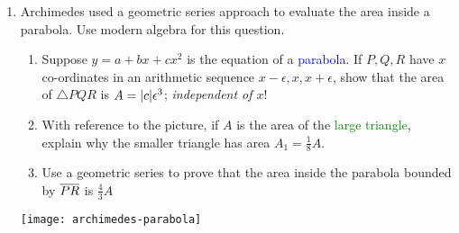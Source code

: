 \begin{exercises}
\begin{enumerate}
	 	\item Archimedes used a geometric series approach to evaluate the area inside a parabola. Use modern algebra for this question.\par
	 	\begin{minipage}[t]{0.6\linewidth}\vspace{-5pt}
	 	 	\begin{enumerate}
	  		\item Suppose $y=a+bx+cx^2$ is the equation of a \textcolor{blue}{parabola}. If $P,Q,R$ have $x$ co-ordinates in an arithmetic sequence $x-\epsilon,x,x+\epsilon$, show that the area of $\triangle PQR$ is $A=\left| c\right|\!\epsilon^3$; \emph{independent of $x$}!
	  		\item With reference to the picture, if $A$ is the area of the \textcolor{Green}{large triangle}, explain why the smaller triangle has area $A_1=\frac 18A$.
	  		\item Use a geometric series to prove that the area inside the parabola bounded by $\overline{PR}$ is $\frac 43A$
	 		\end{enumerate}
	 	\end{minipage}
	 	\hfill
	 	\begin{minipage}[t]{0.39\linewidth}\vspace{-5pt}
	 		\flushright
	 		\texttt{[image: archimedes-parabola]}
	 	\end{minipage}
	
	\end{enumerate}
\end{exercises}







